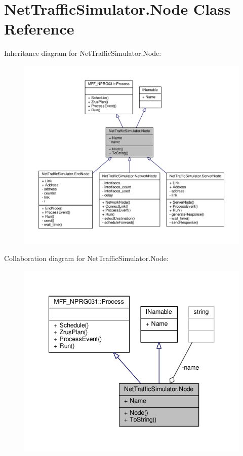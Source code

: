 \hypertarget{classNetTrafficSimulator_1_1Node}{\section{Net\-Traffic\-Simulator.\-Node Class Reference}
\label{classNetTrafficSimulator_1_1Node}
}


Inheritance diagram for Net\-Traffic\-Simulator.\-Node\-:\nopagebreak
\begin{figure}[H]
\begin{center}
\leavevmode
\includegraphics[width=350pt]{classNetTrafficSimulator_1_1Node__inherit__graph}
\end{center}
\end{figure}


Collaboration diagram for Net\-Traffic\-Simulator.\-Node\-:\nopagebreak
\begin{figure}[H]
\begin{center}
\leavevmode
\includegraphics[width=344pt]{classNetTrafficSimulator_1_1Node__coll__graph}
\end{center}
\end{figure}
